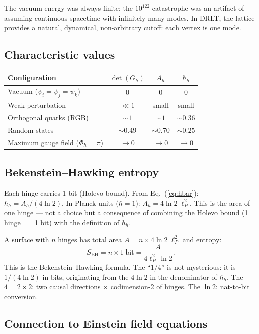 \documentclass[12pt]{article}
\theoremstyle{remark}
\theoremstyle{definition}
\begin{document}
The vacuum energy was always finite; the $10^{122}$ catastrophe was an artifact of assuming continuous spacetime with infinitely many modes. In DRLT, the lattice provides a natural, dynamical, non-arbitrary cutoff: each vertex is one mode.

\subsection{Characteristic values}

\begin{center}
\begin{tabular}{lccc}
\hline
Configuration & $\det(G_h)$ & $A_h$ & $\hbar_h$ \\
\hline
Vacuum ($\psi_i = \psi_j = \psi_k$) & 0 & 0 & 0 \\
Weak perturbation & $\ll 1$ & small & small \\
Orthogonal quarks (RGB) & $\sim 1$ & $\sim 1$ & $\sim 0.36$ \\
Random states & $\sim 0.49$ & $\sim 0.70$ & $\sim 0.25$ \\
Maximum gauge field ($\Phi_h = \pi$) & $\to 0$ & $\to 0$ & $\to 0$ \\
\hline
\end{tabular}
\end{center}

\subsection{Bekenstein--Hawking entropy}

Each hinge carries 1 bit (Holevo bound). From Eq.~(\ref{eq:hbar}): $\hbar_h = A_h/(4\ln 2)$. In Planck units ($\hbar = 1$): $A_h = 4\ln 2\;\ell_P^2$. This is the area of one hinge --- not a choice but a consequence of combining the Holevo bound (1 hinge $=$ 1 bit) with the definition of $\hbar_h$.

A surface with $n$ hinges has total area $A = n \times 4\ln 2\;\ell_P^2$ and entropy:
\begin{equation}
S_\text{BH} = n \times 1\;\text{bit} = \frac{A}{4\ell_P^2\,\ln 2}.
\end{equation}
This is the Bekenstein--Hawking formula. The ``$1/4$'' is not mysterious: it is $1/(4\ln 2)$ in bits, originating from the $4\ln 2$ in the denominator of $\hbar_h$. The $4 = 2 \times 2$: two causal directions $\times$ codimension-2 of hinges. The $\ln 2$: nat-to-bit conversion.

\subsection{Connection to Einstein field equations}
\end{document}
